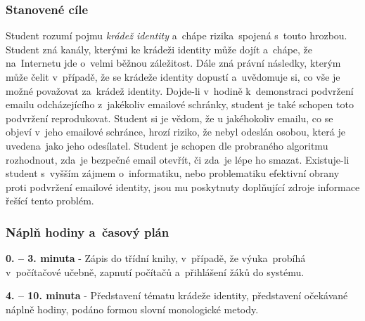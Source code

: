 \documentclass[a4paper, 12pt]{article}
\begin{document}
\subsubsection{Stanovené cíle}
Student rozumí pojmu \textit{krádež identity} a~chápe rizika~spojená s~touto hrozbou. Student zná kanály, kterými ke krádeži identity může dojít a~chápe, že na~Internetu jde o~velmi běžnou záležitost. Dále zná právní následky, kterým může čelit v~případě, že se krádeže identity dopustí a~uvědomuje si, co vše je možné považovat za~krádež identity. Dojde-li v~hodině k~demonstraci podvržení emailu odcházejícího z~jakékoliv emailové schránky, student je také schopen toto podvržení reprodukovat. Student si je vědom, že u jakéhokoliv emailu, co se objeví v~jeho emailové schránce, hrozí riziko, že nebyl odeslán osobou, která je uvedena~jako jeho odesílatel. Student je schopen dle probraného algoritmu rozhodnout, zda~je bezpečné email otevřít, či zda~je lépe ho smazat. Existuje-li student s~vyšším zájmem o~informatiku, nebo problematiku efektivní obrany proti podvržení emailové identity, jsou mu poskytnuty doplňující zdroje informace řešící tento problém.

\subsubsection{Náplň hodiny a~časový plán}
\indent\textbf{0. -- 3. minuta} - Zápis do třídní knihy, v~případě, že výuka~probíhá v~počítačové učebně, zapnutí počítačů a~přihlášení žáků do systému.

\textbf{4. -- 10. minuta} - Představení tématu krádeže identity, představení očekávané náplně hodiny, podáno formou slovní monologické metody.
\end{document}
